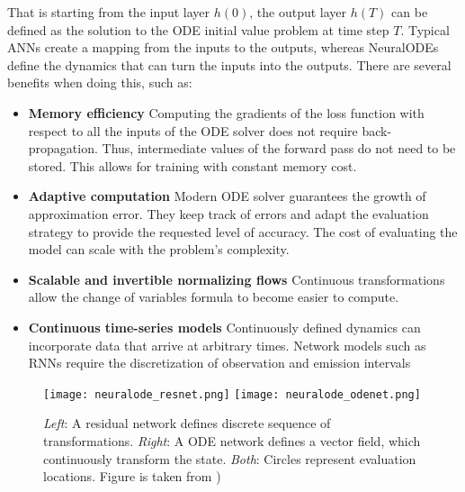 That is starting from the input layer $h(0)$, the output layer $h(T)$ can be defined as the solution to the \gls{ODE} initial value problem at time step $T$.
Typical \glspl{ANN} create a mapping from the inputs to the outputs, whereas \glspl{NeuralODE} define the dynamics that can turn the inputs into the outputs.
There are several benefits when doing this, such as:
\begin{itemize}
    \item \textbf{Memory efficiency}
    Computing the gradients of the loss function with respect to all the inputs of the \gls{ODE} solver does not require back-propagation.
    Thus, intermediate values of the forward pass do not need to be stored.
    This allows for training with constant memory cost.
    \item \textbf{Adaptive computation}
    Modern \gls{ODE} solver guarantees the growth of approximation error.
    They keep track of errors and adapt the evaluation strategy to provide the requested level of accuracy.
    The cost of evaluating the model can scale with the problem's complexity.
    \item \textbf{Scalable and invertible normalizing flows}
    Continuous transformations allow the change of variables formula to become easier to compute.
    \item \textbf{Continuous time-series models}
    Continuously defined dynamics can incorporate data that arrive at arbitrary times.
    Network models such as \glspl{RNN} require the discretization of observation and emission intervals
\end{itemize}

\begin{figure}[h]
    \centering
    \texttt{[image: neuralode\_resnet.png]}
    \texttt{[image: neuralode\_odenet.png]}
    \caption{\textit{Left}: A residual network defines discrete sequence of transformations. \textit{Right}: A ODE network defines a vector field, which continuously transform the state. \textit{Both}: Circles represent evaluation locations. Figure is taken from \citeauthor{chenNeuralOrdinaryDifferential2019} \cite{chenNeuralOrdinaryDifferential2019})}
    \label{fig:resnet-vs-odenet}
\end{figure}


